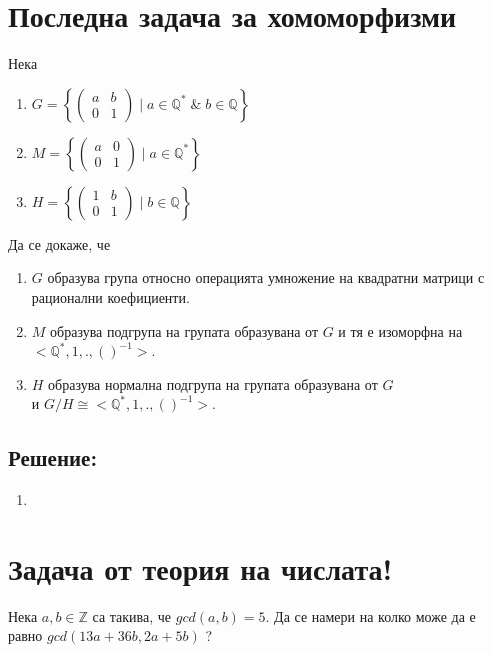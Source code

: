 \documentclass[12pt]{article}
\begin{document}
\section{Последна задача за хомоморфизми}
Нека
\begin{enumerate}
    \item \(G = \left\{\begin{pmatrix}
    a & b \\
    0 & 1
    \end{pmatrix} \; \Big| \; a \in \mathbb{Q}^* \; \& \; b \in \mathbb{Q}\right\}\)
    \item \(M = \left\{\begin{pmatrix}
    a & 0 \\
    0 & 1
    \end{pmatrix} \; \Big| \; a \in \mathbb{Q}^*\right\}\)
    \item \(H = \left\{\begin{pmatrix}
    1 & b \\
    0 & 1
    \end{pmatrix} \; \Big| \; b \in \mathbb{Q}\right\}\)
\end{enumerate}
Да се докаже, че
\begin{enumerate}[label=\alph*)]
    \item \(G\) образува група относно операцията умножение на квадратни матрици с рационални коефициенти.
    \item \(M\) образува подгрупа на групата образувана от \(G\)
    и тя е изоморфна на \(<\mathbb{Q}^*, 1, . , ()^{-1}>\).
    \item \(H\) образува нормална подгрупа на групата образувана от \(G\) \\
    и \(G / H \cong <\mathbb{Q}^*, 1, . , ()^{-1}>\). 
\end{enumerate}
\subsection{Решение:}
\begin{enumerate}[label=\alph*)]
    \item
\end{enumerate}
\section{Задача от теория на числата!}
Нека \(a, b \in \mathbb{Z}\) са такива, че \(gcd(a, b) = 5\).
Да се намери на колко може да е равно \(gcd(13a + 36b, 2a + 5b)\) ?
\end{document}
